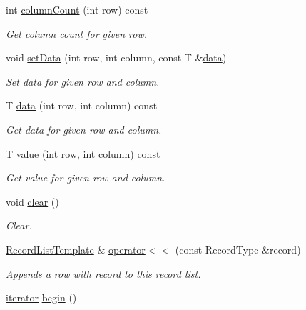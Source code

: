 \begin{DoxyCompactItemize}
int \hyperlink{class_mdt_1_1_plain_text_1_1_record_list_template_a59bfaf592d639840e2ce965b11185477}{column\+Count} (int row) const 
\begin{DoxyCompactList}\small\item\em Get column count for given row. \end{DoxyCompactList}\item 
void \hyperlink{class_mdt_1_1_plain_text_1_1_record_list_template_a53a8348c93099f99a8c53426c50e958b}{set\+Data} (int row, int column, const T \&\hyperlink{class_mdt_1_1_plain_text_1_1_record_list_template_a8bccf84419669f678d3f055d89fed002}{data})
\begin{DoxyCompactList}\small\item\em Set data for given row and column. \end{DoxyCompactList}\item 
T \hyperlink{class_mdt_1_1_plain_text_1_1_record_list_template_a8bccf84419669f678d3f055d89fed002}{data} (int row, int column) const 
\begin{DoxyCompactList}\small\item\em Get data for given row and column. \end{DoxyCompactList}\item 
T \hyperlink{class_mdt_1_1_plain_text_1_1_record_list_template_ac009f422a8f6b82f3633e2629c32ca52}{value} (int row, int column) const 
\begin{DoxyCompactList}\small\item\em Get value for given row and column. \end{DoxyCompactList}\item 
void \hyperlink{class_mdt_1_1_plain_text_1_1_record_list_template_aca9f27ea6367e4753dbcc07f457547b4}{clear} ()
\begin{DoxyCompactList}\small\item\em Clear. \end{DoxyCompactList}\item 
\hyperlink{class_mdt_1_1_plain_text_1_1_record_list_template}{Record\+List\+Template} \& \hyperlink{class_mdt_1_1_plain_text_1_1_record_list_template_a9e41a19aba8a50bbeabc0e1e76dd4b42}{operator$<$$<$} (const Record\+Type \&record)
\begin{DoxyCompactList}\small\item\em Appends a row with {\itshape record} to this record list. \end{DoxyCompactList}\item 
\hyperlink{class_mdt_1_1_plain_text_1_1_record_list_template_a5b0caae56b05a38e53539cad1da8cd12}{iterator} \hyperlink{class_mdt_1_1_plain_text_1_1_record_list_template_af4f42b3785c7ddbbafd9bf3c15ead7d4}{begin} ()

\end{DoxyCompactItemize}
